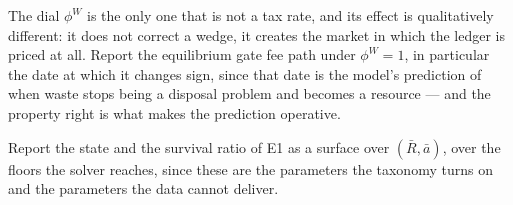  The dial $\phi^W$ is the only one that is not a tax rate, and its effect is qualitatively different: it does not correct a wedge, it creates the market in which the ledger is priced at all. Report the equilibrium gate fee path under $\phi^W=1$, in particular the date at which it changes sign, since that date is the model's prediction of when waste stops being a disposal problem and becomes a resource --- and the property right is what makes the prediction operative.

 Report the state and the survival ratio of E1 as a surface over $\left(\bar R,\bar a\right)$, over the floors the solver reaches, since these are the parameters the taxonomy turns on and the parameters the data cannot deliver.
